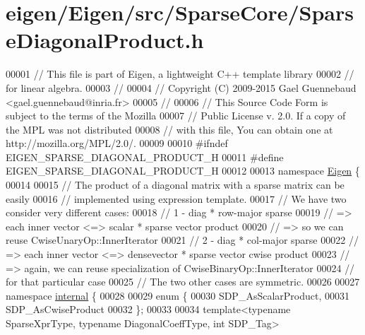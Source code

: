 \hypertarget{eigen_2_eigen_2src_2_sparse_core_2_sparse_diagonal_product_8h_source}{}\section{eigen/\+Eigen/src/\+Sparse\+Core/\+Sparse\+Diagonal\+Product.h}
\label{eigen_2_eigen_2src_2_sparse_core_2_sparse_diagonal_product_8h_source}

\begin{DoxyCode}
00001 \textcolor{comment}{// This file is part of Eigen, a lightweight C++ template library}
00002 \textcolor{comment}{// for linear algebra.}
00003 \textcolor{comment}{//}
00004 \textcolor{comment}{// Copyright (C) 2009-2015 Gael Guennebaud <gael.guennebaud@inria.fr>}
00005 \textcolor{comment}{//}
00006 \textcolor{comment}{// This Source Code Form is subject to the terms of the Mozilla}
00007 \textcolor{comment}{// Public License v. 2.0. If a copy of the MPL was not distributed}
00008 \textcolor{comment}{// with this file, You can obtain one at http://mozilla.org/MPL/2.0/.}
00009 
00010 \textcolor{preprocessor}{#ifndef EIGEN\_SPARSE\_DIAGONAL\_PRODUCT\_H}
00011 \textcolor{preprocessor}{#define EIGEN\_SPARSE\_DIAGONAL\_PRODUCT\_H}
00012 
00013 \textcolor{keyword}{namespace }\hyperlink{namespace_eigen}{Eigen} \{ 
00014 
00015 \textcolor{comment}{// The product of a diagonal matrix with a sparse matrix can be easily}
00016 \textcolor{comment}{// implemented using expression template.}
00017 \textcolor{comment}{// We have two consider very different cases:}
00018 \textcolor{comment}{// 1 - diag * row-major sparse}
00019 \textcolor{comment}{//     => each inner vector <=> scalar * sparse vector product}
00020 \textcolor{comment}{//     => so we can reuse CwiseUnaryOp::InnerIterator}
00021 \textcolor{comment}{// 2 - diag * col-major sparse}
00022 \textcolor{comment}{//     => each inner vector <=> densevector * sparse vector cwise product}
00023 \textcolor{comment}{//     => again, we can reuse specialization of CwiseBinaryOp::InnerIterator}
00024 \textcolor{comment}{//        for that particular case}
00025 \textcolor{comment}{// The two other cases are symmetric.}
00026 
00027 \textcolor{keyword}{namespace }\hyperlink{namespaceinternal}{internal} \{
00028 
00029 \textcolor{keyword}{enum} \{
00030   SDP\_AsScalarProduct,
00031   SDP\_AsCwiseProduct
00032 \};
00033   
00034 \textcolor{keyword}{template}<\textcolor{keyword}{typename} SparseXprType, \textcolor{keyword}{typename} DiagonalCoeffType, \textcolor{keywordtype}{int} SDP\_Tag>

\end{DoxyCode}
